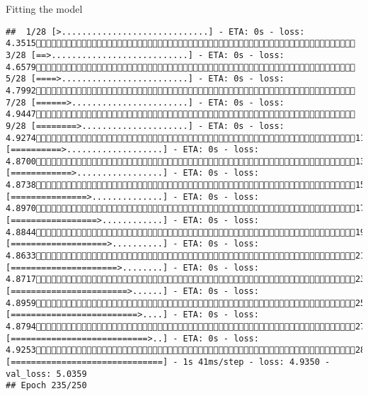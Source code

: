 \documentclass[
  ignorenonframetext,
]{beamer}
\begin{document}
\begin{frame}[fragile]{Fitting the model}
\begin{verbatim}
##  1/28 [>.............................] - ETA: 0s - loss: 4.3515 3/28 [==>...........................] - ETA: 0s - loss: 4.6579 5/28 [====>.........................] - ETA: 0s - loss: 4.7992 7/28 [======>.......................] - ETA: 0s - loss: 4.9447 9/28 [========>.....................] - ETA: 0s - loss: 4.927411/28 [==========>...................] - ETA: 0s - loss: 4.870013/28 [============>.................] - ETA: 0s - loss: 4.873815/28 [===============>..............] - ETA: 0s - loss: 4.897017/28 [=================>............] - ETA: 0s - loss: 4.884419/28 [===================>..........] - ETA: 0s - loss: 4.863321/28 [=====================>........] - ETA: 0s - loss: 4.871723/28 [=======================>......] - ETA: 0s - loss: 4.895925/28 [=========================>....] - ETA: 0s - loss: 4.879427/28 [===========================>..] - ETA: 0s - loss: 4.925328/28 [==============================] - 1s 41ms/step - loss: 4.9350 - val_loss: 5.0359
## Epoch 235/250

\end{verbatim}
\end{frame}
\end{document}
